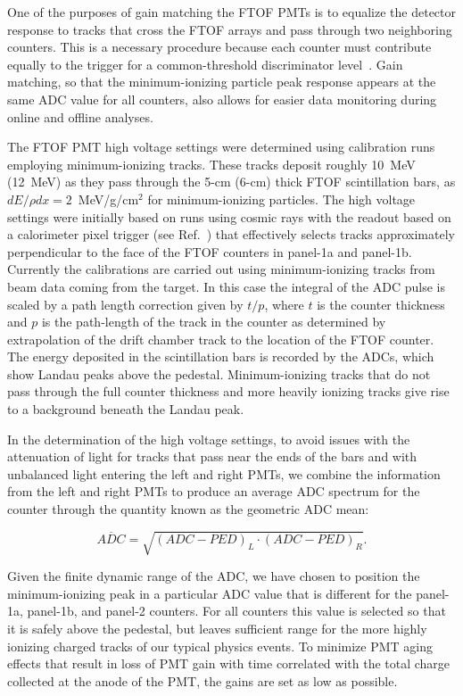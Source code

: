 \documentclass[3p,times,twocolumn]{elsarticle}
\begin{document}
One of the purposes of gain matching the FTOF PMTs is to equalize the detector response to tracks that
cross the FTOF arrays and pass through two neighboring counters. This is a necessary procedure because each
counter must contribute equally to the trigger for a common-threshold discriminator level~\cite{trigger-nim}.
Gain matching, so that the minimum-ionizing particle peak response appears at the same ADC value for all
counters, also allows for easier data monitoring during online and offline analyses.

The FTOF PMT high voltage settings were determined using calibration runs employing minimum-ionizing
tracks. These tracks deposit roughly 10~MeV (12~MeV) as they pass through the 5-cm (6-cm) thick FTOF
scintillation bars, as $dE/\rho dx = 2$~MeV/g/cm$^2$ for minimum-ionizing particles. The high voltage
settings were initially based on runs using cosmic rays with the readout based on a calorimeter pixel trigger
(see Ref.~\cite{ec-nim}) that effectively selects tracks approximately perpendicular to the face of the FTOF
counters in panel-1a and panel-1b. Currently the calibrations are carried out using minimum-ionizing tracks from
beam data coming from the target. In this case the integral of the ADC pulse is scaled by a path length
correction given by $t/p$, where $t$ is the counter thickness and $p$ is the path-length of the track in the
counter as determined by extrapolation of the drift chamber track to the location of the FTOF counter. The
energy deposited in the scintillation bars is recorded by the ADCs,  which show Landau peaks above the pedestal.
Minimum-ionizing tracks that do not pass through the full counter thickness and more heavily ionizing tracks give
rise to a background beneath the Landau peak.

In the determination of the high voltage settings, to avoid issues with the attenuation of light for tracks that
pass near the ends of the bars and with unbalanced light entering the left and right PMTs, we combine the
information from the left and right PMTs to produce an average ADC spectrum for the counter through the
quantity known as the geometric ADC mean:

\begin{equation}
\label{adc}
\overline{ADC} = \sqrt{ (ADC - PED)_L \cdot (ADC - PED)_R}.
\end{equation}

Given the finite dynamic range of the ADC, we have chosen to position the minimum-ionizing peak in a
particular ADC value that is different for the panel-1a, panel-1b, and panel-2 counters. For all counters
this value is selected so that it is safely above the pedestal, but leaves sufficient range for the more
highly ionizing charged tracks of our typical physics events. To minimize PMT aging effects that result in
loss of PMT gain with time correlated with the total charge collected at the anode of the PMT, the gains
are set as low as possible.
\end{document}
